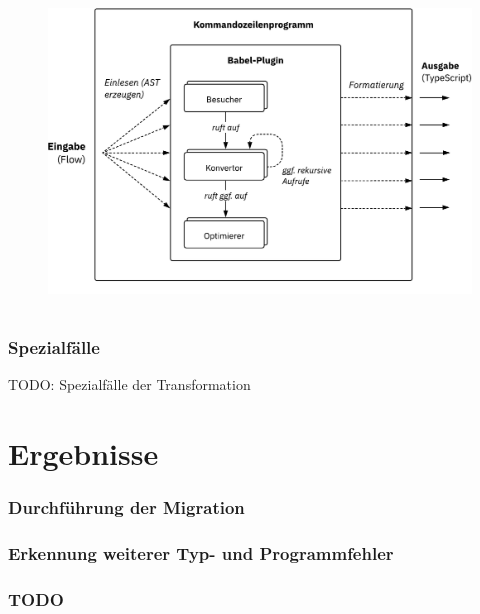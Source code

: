     \begin{frame}[plain]
      \begin{columns}
        \column{\dimexpr\paperwidth-6mm}
        \begin{figure}
          \includegraphics[width=\textwidth]{src/figures/architecture-overview.pdf}
        \end{figure}
      \end{columns}
    \end{frame}

    \begin{frame}
      \frametitle{Spezialfälle}
      TODO: Spezialfälle der Transformation
    \end{frame}

  \section{Ergebnisse}

    \begin{frame}
      \frametitle{Durchführung der Migration}

    \end{frame}

    \begin{frame}
      \frametitle{Erkennung weiterer Typ- und Programmfehler}


    \end{frame}

    \begin{frame}
      \frametitle{TODO}

    \end{frame}

